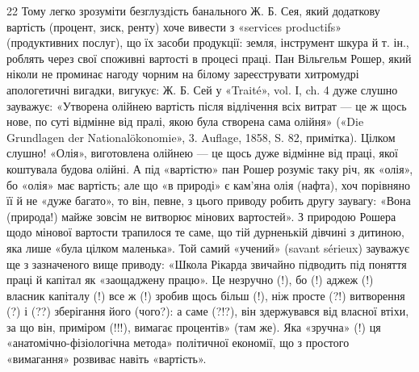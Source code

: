 22    Тому легко зрозуміти безглуздість банального Ж. Б. Сея, який додаткову
вартість (процент, зиск, ренту) хоче вивести з «services productifs»
(продуктивних послуг), що їх засоби продукції: земля, інструмент
шкура й т. ін., роблять через свої споживні вартості в процесі праці.
Пан Вільгельм Рошер, який ніколи не проминає нагоду чорним на білому
зареєструвати хитромудрі апологетичні вигадки, вигукує: Ж. Б. Сей
у «Traité», vol. І, ch. 4 дуже слушно зауважує: «Утворена олійнею вартість
після відлічення всіх витрат — це ж щось нове, по суті відмінне від
пралі, якою була створена сама олійня» («Die Grundlagen der Nationalökonomie»,
3. Auflage, 1858, S. 82, примітка). Цілком слушно! «Олія»,
виготовлена олійнею — це щось дуже відмінне від праці, якої коштувала
будова олійні. А під «вартістю» пан Рошер розуміє таку річ, як «олія»,
бо «олія» має вартість; але що «в природі» є кам’яна олія (нафта), хоч
порівняно її й не «дуже багато», то він, певне, з цього приводу робить
другу заувагу: «Вона (природа!) майже зовсім не витворює мінових
вартостей». З природою Рошера щодо мінової вартости трапилося те саме,
що тій дурненькій дівчині з дитиною, яка лише «була цілком маленька».
Той самий «учений» (savant sérieux) зауважує ще з зазначеного вище
приводу: «Школа Рікарда звичайно підводить під поняття праці й капітал
як «заощаджену працю». Це незручно (!), бо (!) аджеж (!) власник капіталу
(!) все ж (!) зробив щось більш (!), ніж просте (?!) витворення (?)
і (??) зберігання його (чого?): а саме (?!?), він здержувався від власної
втіхи, за що він, приміром (!!!), вимагає процентів» (там же). Яка «зручна»
(!) ця «анатомічно-фізіологічна метода» політичної економії, що з
простого «вимагання» розвиває навіть «вартість».

